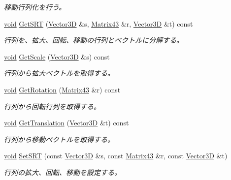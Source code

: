 \begin{DoxyCompactItemize}
\begin{DoxyCompactList}\small\item\em 移動行列化を行う。 \end{DoxyCompactList}\item 
\mbox{\hyperlink{namespace_effekseer_ab34c4088e512200cf4c2716f168deb56}{void}} \mbox{\hyperlink{struct_effekseer_1_1_matrix43_acd744255ba17ef26cffe31a7add9af28}{Get\+S\+RT}} (\mbox{\hyperlink{struct_effekseer_1_1_vector3_d}{Vector3D}} \&s, \mbox{\hyperlink{struct_effekseer_1_1_matrix43}{Matrix43}} \&r, \mbox{\hyperlink{struct_effekseer_1_1_vector3_d}{Vector3D}} \&t) const
\begin{DoxyCompactList}\small\item\em 行列を、拡大、回転、移動の行列とベクトルに分解する。 \end{DoxyCompactList}\item 
\mbox{\hyperlink{namespace_effekseer_ab34c4088e512200cf4c2716f168deb56}{void}} \mbox{\hyperlink{struct_effekseer_1_1_matrix43_afeae9f15d80c7d4965c307e3b3cf9462}{Get\+Scale}} (\mbox{\hyperlink{struct_effekseer_1_1_vector3_d}{Vector3D}} \&s) const
\begin{DoxyCompactList}\small\item\em 行列から拡大ベクトルを取得する。 \end{DoxyCompactList}\item 
\mbox{\hyperlink{namespace_effekseer_ab34c4088e512200cf4c2716f168deb56}{void}} \mbox{\hyperlink{struct_effekseer_1_1_matrix43_a66360ac2c7e8ef69819409d3d44dbba1}{Get\+Rotation}} (\mbox{\hyperlink{struct_effekseer_1_1_matrix43}{Matrix43}} \&r) const
\begin{DoxyCompactList}\small\item\em 行列から回転行列を取得する。 \end{DoxyCompactList}\item 
\mbox{\hyperlink{namespace_effekseer_ab34c4088e512200cf4c2716f168deb56}{void}} \mbox{\hyperlink{struct_effekseer_1_1_matrix43_a1d6f78af215db6380925e866c73ad829}{Get\+Translation}} (\mbox{\hyperlink{struct_effekseer_1_1_vector3_d}{Vector3D}} \&t) const
\begin{DoxyCompactList}\small\item\em 行列から移動ベクトルを取得する。 \end{DoxyCompactList}\item 
\mbox{\hyperlink{namespace_effekseer_ab34c4088e512200cf4c2716f168deb56}{void}} \mbox{\hyperlink{struct_effekseer_1_1_matrix43_a4632f96e5666f10f2029c3925aaf6a9d}{Set\+S\+RT}} (const \mbox{\hyperlink{struct_effekseer_1_1_vector3_d}{Vector3D}} \&s, const \mbox{\hyperlink{struct_effekseer_1_1_matrix43}{Matrix43}} \&r, const \mbox{\hyperlink{struct_effekseer_1_1_vector3_d}{Vector3D}} \&t)
\begin{DoxyCompactList}\small\item\em 行列の拡大、回転、移動を設定する。 \end{DoxyCompactList}\end{DoxyCompactItemize}
